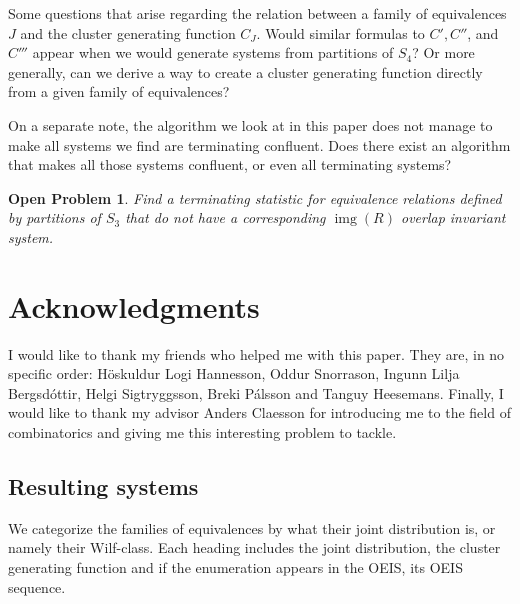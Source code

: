\documentclass[a4paper, 11pt, english]{article}
\newtheorem{openproblem}[theorem]{Open Problem}
\theoremstyle{definition}
\newcommand{\Sym}{S}
\DeclareMathOperator{\img}{img}
\begin{document}
Some questions that arise regarding the relation between a family of equivalences $J$ and
the cluster generating function $C_J$.
Would similar formulas to $C', C''$, and $C'''$ appear when we would
generate systems from partitions of $\Sym_4$? 
Or more generally, 
can we derive a way to create a cluster generating function directly from a
given family of equivalences? 

On a separate note, the algorithm we look at in this paper does not manage to make all systems
we find are terminating confluent. Does there exist an algorithm that makes all those systems
confluent, or even all terminating systems?

\begin{openproblem}
    Find a terminating statistic for equivalence relations
    defined by partitions of $\Sym_3$ that do not have a corresponding $\img(R)$ overlap invariant system.
\end{openproblem}

\section*{Acknowledgments}
I would like to thank my friends who helped me with this paper. They are, in no specific order: Höskuldur
Logi Hannesson, Oddur Snorrason, Ingunn Lilja Bergsdóttir, Helgi Sigtryggsson, Breki Pálsson and
Tanguy Heesemans. Finally, I would like to thank my advisor Anders Claesson for introducing me to the
field of combinatorics and giving me this interesting problem to tackle.

\clearpage




\clearpage

\begin{appendices}

\clearpage

\section{Resulting systems}
We categorize the families of equivalences by what their joint
distribution is, or namely their Wilf-class.
Each heading includes the joint distribution, the cluster generating function and if the enumeration
appears in the OEIS, its OEIS sequence.

\begin{multicols}{2}

\end{multicols}
\end{appendices}
\end{document}
